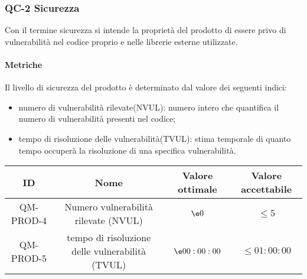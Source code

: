 \subsubsection{QC-2 Sicurezza}
Con il termine sicurezza si intende la proprietà del prodotto di essere privo di vulnerabilità nel codice proprio e nelle librerie esterne utilizzate.

	\paragraph{Metriche}
	Il livello di sicurezza del prodotto è determinato dal valore dei seguenti indici:
	\begin{itemize}
		\item numero di vulnerabilità rilevate(NVUL): numero intero che quantifica il numero di vulnerabilità presenti nel codice;
		\item tempo di risoluzione delle vulnerabilità(TVUL): stima temporale di quanto tempo occuperà la risoluzione di una specifica vulnerabilità.
	\end{itemize}
	\begin{center}
		\begin{tabular}{|c|c|c|c|}
			\rowcolor{lighter-grayer}
			\hline
			ID & Nome & Valore ottimale & Valore accettabile \\
			\hline
			QM-PROD-4 & Numero vulnerabilità rilevate (NVUL) & \(\e 0\) & \(\le 5\) \\
			\hline
			QM-PROD-5 & tempo di risoluzione delle vulnerabilità (TVUL) & \(\e 00:00:00\) &  \(\le 01:00:00\) \\
			\hline
		\end{tabular}
	\end{center}
